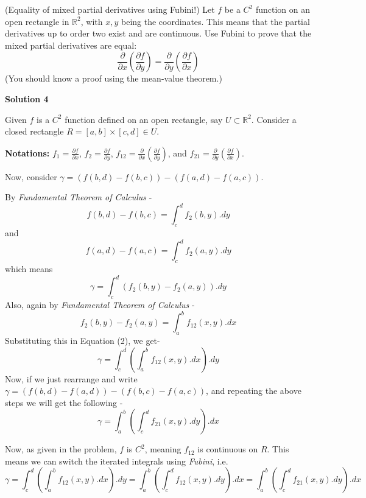 \documentclass[12pt,a4paper]{article}
\theoremstyle{definition}
\begin{document}
\begin{flushleft}
(Equality of mixed partial derivatives using Fubini!) Let $f$ be a $C^2$ function on an open rectangle in $\mathbb{R}^2$, with $x,y$ being the coordinates. This means that the partial derivatives up to order two exist  and are continuous. Use Fubini to prove that the mixed partial derivatives are equal:
$$
\frac{\partial }{ \partial x} (\frac{\partial f}{ \partial y})= \frac{\partial }{ \partial y} (\frac{\partial f}{ \partial x})
$$
(You should know a proof using the mean-value theorem.)

\bigskip

{\bf Solution 4}

Given $f$ is a $C^2$ function defined on an open rectangle, say $U \subset \mathbb{R}^2$. Consider a closed rectangle $R = [a,b] \times [c,d] \in U$.

\medskip

{\bf Notations:} $f_1 = \frac{\partial f}{\partial x}$, $f_2 = \frac{\partial f}{\partial y}$, $f_{12} = \frac{\partial}{\partial x}(\frac{\partial f}{\partial y})$, and $f_{21} = \frac{\partial}{\partial y}(\frac{\partial f}{\partial x})$.

\medskip

Now, consider $\gamma = (f(b,d) - f(b,c)) - (f(a,d) - f(a,c))$.

By {\it Fundamental Theorem of Calculus} -
$$f(b,d) - f(b,c) = \int_{c}^{d} f_2(b,y).dy $$
and
$$f(a,d) - f(a,c) = \int_{c}^{d} f_2(a,y).dy$$
which means
\begin{equation}
	\gamma = \int_{c}^{d} (f_2(b,y)-f_2(a,y)).dy
\end{equation}
Also, again by {\it Fundamental Theorem of Calculus} -
$$f_2(b,y)-f_2(a,y) = \int_{a}^{b} f_{12} (x,y).dx$$
Substituting this in Equation (2), we get-
\begin{equation}
	\gamma = \int_{c}^{d}(\int_{a}^{b} f_{12} (x,y).dx).dy
\end{equation}
Now, if we just rearrange and write $\gamma = (f(b,d) - f(a,d)) - (f(b,c) - f(a,c))$, and repeating the above steps we will get the following -
\begin{equation}
	\gamma = \int_{a}^{b}(\int_{c}^{d} f_{21} (x,y).dy).dx
\end{equation}

Now, as given in the problem, $f$ is $C^2$, meaning $f_{12}$ is continuous on $R$. This means we can switch the iterated integrals using {\it Fubini}, i.e.
\begin{equation}
	\gamma = \int_{c}^{d}(\int_{a}^{b} f_{12} (x,y).dx).dy = \int_{a}^{b}(\int_{c}^{d} f_{12} (x,y).dy).dx = \int_{a}^{b}(\int_{c}^{d} f_{21} (x,y).dy).dx
\end{equation}


\end{flushleft}
\end{document}
